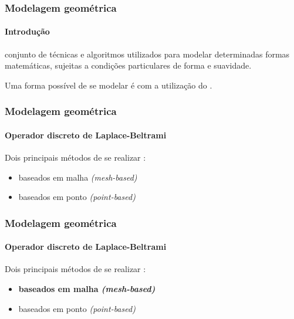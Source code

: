 \begin{frame}
\frametitle{Modelagem geométrica}
\framesubtitle{Introdução}

 conjunto de técnicas e algoritmos utilizados para modelar determinadas formas matemáticas, sujeitas a condições particulares de forma e suavidade.

\medskip
Uma forma possível de se modelar é com a utilização do .

\end{frame}

\begin{frame}
\frametitle{Modelagem geométrica}
\framesubtitle{Operador discreto de Laplace-Beltrami}

Dois principais métodos de se realizar \cite{petronetto2013}:
\begin{itemize}
\item baseados em malha \textit{(mesh-based)}
\item baseados em ponto \textit{(point-based)}
\end{itemize}
    
\end{frame}

\begin{frame}
	\frametitle{Modelagem geométrica}
	\framesubtitle{Operador discreto de Laplace-Beltrami}
	
	Dois principais métodos de se realizar \cite{petronetto2013}:
	\begin{itemize}
		\item \textbf{baseados em malha \textit{(mesh-based)}}
		\item baseados em ponto \textit{(point-based)}
	\end{itemize}
\end{frame}


